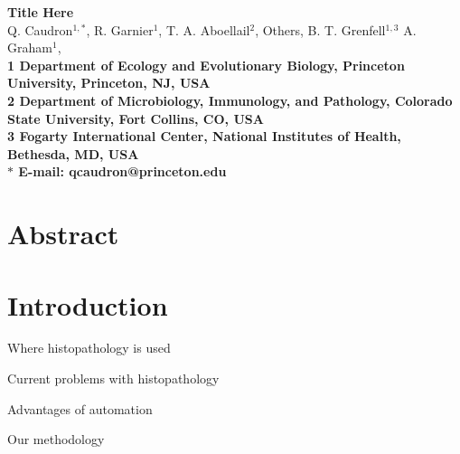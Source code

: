 \documentclass[10pt]{article}
\date{}
\begin{document}
\begin{flushleft}
{\Large
\textbf{Title Here}
}
\\
Q. Caudron$^{1,\ast}$, 
R. Garnier$^{1}$, 
T. A. Aboellail$^2$,
Others, 
B. T. Grenfell$^{1,3}$
A. Graham$^1$,
\\
\bf{1} Department of Ecology and Evolutionary Biology, Princeton University, Princeton, NJ, USA
\\
\bf{2} Department of Microbiology, Immunology, and Pathology, Colorado State University, Fort Collins, CO, USA
\\
\bf{3} Fogarty International Center, National Institutes of Health, Bethesda, MD, USA
\\
$\ast$ E-mail: qcaudron@princeton.edu
\end{flushleft}













\section*{Abstract}















\section*{Introduction}


Where histopathology is used



Current problems with histopathology



Advantages of automation



Our methodology
\end{document}
